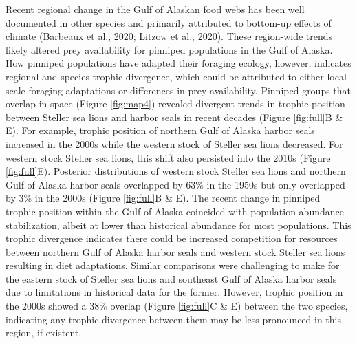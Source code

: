 \documentclass [11pt, proquest] {uwthesis}[2015/03/03]
\begin{document}
Recent regional change in the Gulf of Alaskan food webs has been well
documented in other species and primarily attributed to bottom-up
effects of climate (Barbeaux et al.,
\protect\hyperlink{ref-Barbeaux2020}{2020}; Litzow et al.,
\protect\hyperlink{ref-Litzow2020}{2020}). These region-wide trends
likely altered prey availability for pinniped populations in the Gulf of
Alaska. How pinniped populations have adapted their foraging ecology,
however, indicates regional and species trophic divergence, which could
be attributed to either local-scale foraging adaptations or differences
in prey availability. Pinniped groups that overlap in space (Figure
\ref{fig:map4}) revealed divergent trends in trophic position between
Steller sea lions and harbor seals in recent decades (Figure
\ref{fig:full}B \& E). For example, trophic position of northern Gulf of
Alaska harbor seals increased in the 2000s while the western stock of
Steller sea lions decreased. For western stock Steller sea lions, this
shift also persisted into the 2010s (Figure \ref{fig:full}E). Posterior
distributions of western stock Steller sea lions and northern Gulf of
Alaska harbor seals overlapped by 63\% in the 1950s but only overlapped
by 3\% in the 2000s (Figure \ref{fig:full}B \& E). The recent change in
pinniped trophic position within the Gulf of Alaska coincided with
population abundance stabilization, albeit at lower than historical
abundance for most populations. This trophic divergence indicates there
could be increased competition for resources between northern Gulf of
Alaska harbor seals and western stock Steller sea lions resulting in
diet adaptations. Similar comparisons were challenging to make for the
eastern stock of Steller sea lions and southeast Gulf of Alaska harbor
seals due to limitations in historical data for the former. However,
trophic position in the 2000s showed a 38\% overlap (Figure
\ref{fig:full}C \& E) between the two species, indicating any trophic
divergence between them may be less pronounced in this region, if
existent.
\end{document}
